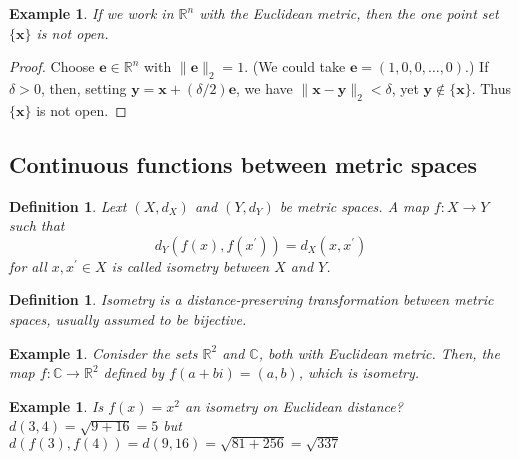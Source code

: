 \documentclass[12pt,a4paper]{article}
\theoremstyle{plain}
\newtheorem{example}[theorem]{Example}
\newtheorem{definition}[theorem]{Definition}
\begin{document}
\begin{example}
    If we work in ${\mathbb R}^{n}$ with the Euclidean metric, then the one point set $\{{\mathbf x}\}$ is not open.
\end{example}
\begin{proof}
    Choose ${\mathbf e}\in{\mathbb R}^{n}$ with $\|{\mathbf e}\|_{2}=1$.
(We could take ${\mathbf e}=(1,0,0,\ldots,0)$.) If $\delta>0$,
then, setting ${\mathbf y}={\mathbf x}+(\delta/2){\mathbf e}$, we have
$\|{\mathbf x}-{\mathbf y}\|_{2}<\delta$, 
yet ${\mathbf y}\notin\{{\mathbf x}\}$.
Thus $\{{\mathbf x}\}$ is not open.
\end{proof}

\subsection{Continuous functions between metric spaces}
\begin{definition}
    Lext $(X,d_X)$ and $(Y,d_Y)$ be metric spaces. A map $f: X\rightarrow Y$ such that 
    \begin{equation}
        d_Y(f(x),f(x^{'}))=d_X(x,x^{'})
    \end{equation}
    for all $x,x^{'}\in X$ is called isometry between $X$ and $Y$. 
\end{definition}

\begin{definition}
    \emph{Isometry} is a distance-preserving transformation between metric spaces, usually assumed to be bijective.
\end{definition}

\begin{example}
    Conisder the sets $\mathbb{R}^2$ and $\mathbb{C}$, both with Euclidean metric. Then, the map $f: \mathbb{C}\rightarrow \mathbb{R}^2$ defined by $f(a+bi)=(a,b)$, which is isometry. 
\end{example}

\begin{example}
    Is $f(x)=x^2$ an isometry on Euclidean distance?
    $d(3,4)=\sqrt{9+16}=5$ but $d(f(3),f(4))=d(9,16)=\sqrt{81+256}=\sqrt{337}$
\end{example}
\end{document}
